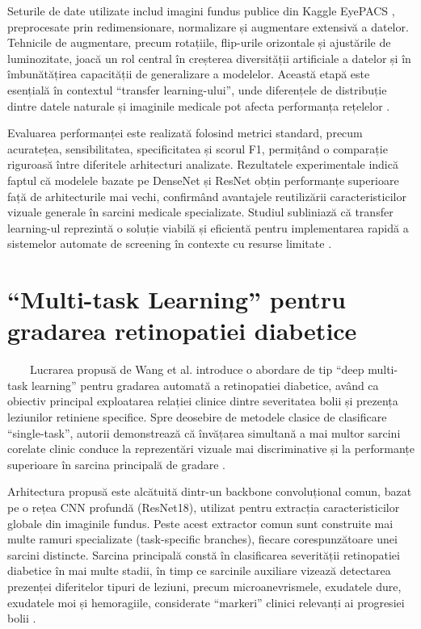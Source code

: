 \documentclass[12pt, a4paper, oneside, romanian]{teza-upb}
\begin{document}
Seturile de date utilizate includ imagini fundus publice din Kaggle EyePACS \cite{9_chetoui2020explainable}, preprocesate prin
redimensionare, normalizare și augmentare extensivă a datelor. Tehnicile de augmentare, precum
rotațiile, flip-urile orizontale și ajustările de luminozitate, joacă un rol central în creșterea diversității
artificiale a datelor și în îmbunătățirea capacității de generalizare a modelelor. Această etapă este
esențială în contextul “transfer learning-ului”, unde diferențele de distribuție dintre datele naturale și
imaginile medicale pot afecta performanța rețelelor \cite{10_jabbar2022transfer}.
\bigskip

Evaluarea performanței este realizată folosind metrici standard, precum acuratețea,
sensibilitatea, specificitatea și scorul F1, permițând o comparație riguroasă între diferitele arhitecturi
analizate. Rezultatele experimentale indică faptul că modelele bazate pe DenseNet și ResNet obțin
performanțe superioare față de arhitecturile mai vechi, confirmând avantajele reutilizării caracteristicilor
vizuale generale în sarcini medicale specializate. Studiul subliniază că transfer learning-ul reprezintă o
soluție viabilă și eficientă pentru implementarea rapidă a sistemelor automate de screening în contexte
cu resurse limitate \cite{10_jabbar2022transfer}.

\section{“Multi-task Learning” pentru gradarea retinopatiei diabetice \cite{6_wang2021deep}}

\ \ \ \ Lucrarea propusă de Wang et al. \cite{6_wang2021deep} introduce o abordare de tip “deep multi-task learning”
pentru gradarea automată a retinopatiei diabetice, având ca obiectiv principal exploatarea relației clinice
dintre severitatea bolii și prezența leziunilor retiniene specifice. Spre deosebire de metodele clasice de
clasificare “single-task”, autorii demonstrează că învățarea simultană a mai multor sarcini corelate clinic
conduce la reprezentări vizuale mai discriminative și la performanțe superioare în sarcina principală de
gradare \cite{6_wang2021deep}.
\bigskip

Arhitectura propusă este alcătuită dintr-un backbone convoluțional comun, bazat pe o rețea CNN
profundă (ResNet18), utilizat pentru extracția caracteristicilor globale din imaginile fundus. Peste acest
extractor comun sunt construite mai multe ramuri specializate (task-specific branches), fiecare 
corespunzătoare unei sarcini distincte. Sarcina principală constă în clasificarea severității retinopatiei
diabetice în mai multe stadii, în timp ce sarcinile auxiliare vizează detectarea prezenței diferitelor tipuri
de leziuni, precum microanevrismele, exudatele dure, exudatele moi și hemoragiile, considerate
“markeri” clinici relevanți ai progresiei bolii \cite{6_wang2021deep}.
\bigskip
\end{document}

